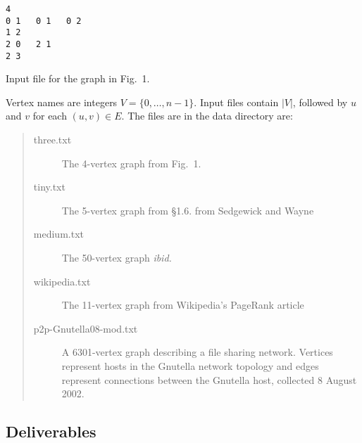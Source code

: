 \documentclass{tufte-handout}
\begin{document}
\begin{marginfigure}
\begin{verbatim}
4
0 1   0 1   0 2
1 2   
2 0   2 1
2 3
\end{verbatim}
\caption{Input file for the graph in Fig.~1.}
\end{marginfigure}

Vertex names are integers $V= \{0,\ldots, n-1\}$.
Input files contain $|V|$, followed by $u$ and $v$ for each $(u,v)\in
E$.
The files are in the data directory are:
\begin{quotation}
\begin{description}
\item[three.txt] The 4-vertex graph from Fig.~1.
\item[tiny.txt] The 5-vertex graph from \S{}1.6. from Sedgewick and
  Wayne
\item[medium.txt] The 50-vertex graph \emph{ibid.}
\item[wikipedia.txt] The 11-vertex graph from Wikipedia's PageRank article
\item[p2p-Gnutella08-mod.txt] A 6301-vertex graph describing a file
  sharing network. 
Vertices represent hosts in the Gnutella network topology and edges
represent connections between the Gnutella host, collected 8 August
2002.
\end{description}
\end{quotation}

\subsection{Deliverables}
\end{document}
